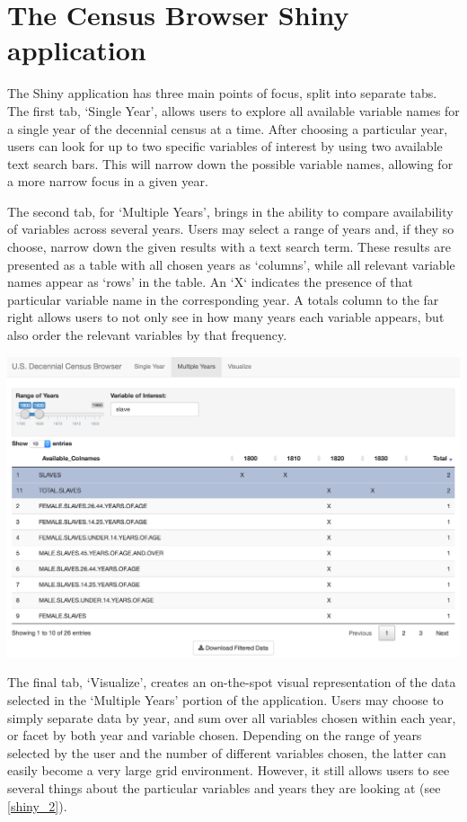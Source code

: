 \documentclass[DIV=calc, paper=a4, fontsize=10pt, twocolumn]{scrartcl}\usepackage[]{graphicx}\usepackage[]{color}
\begin{document}
\section*{The Census Browser Shiny application}  

\par The Shiny application has three main points of focus, split into separate tabs. The first tab, `Single Year', allows users to explore all available variable names for a single year of the decennial census at a time. After choosing a particular year, users can look for up to two specific variables of interest by using two available text search bars. This will narrow down the possible variable names, allowing for a more narrow focus in a given year.  

\par The second tab, for `Multiple Years', brings in the ability to compare availability of variables across several years. Users may select a range of years and, if they so choose, narrow down the given results with a text search term. These results are presented as a table with all chosen years as `columns', while all relevant variable names appear as `rows' in the table. An `X` indicates the presence of that particular variable name in the corresponding year. A totals column to the far right allows users to not only see in how many years each variable appears, but also order the relevant variables by that frequency.  

\begin{center}
\includegraphics[width=.48\textwidth]{./figures/search_slaves_40years.png}  
\label{shiny_1}
\end{center}

\par The final tab, `Visualize', creates an on-the-spot visual representation of the data selected in the `Multiple Years' portion of the application. Users may choose to simply separate data by year, and sum over all variables chosen within each year, or facet by both year and variable chosen. Depending on the range of years selected by the user and the number of different variables chosen, the latter can easily become a very large grid environment. However, it still allows users to see several things about the particular variables and years they are looking at (see \autoref{shiny_2}).
\end{document}

